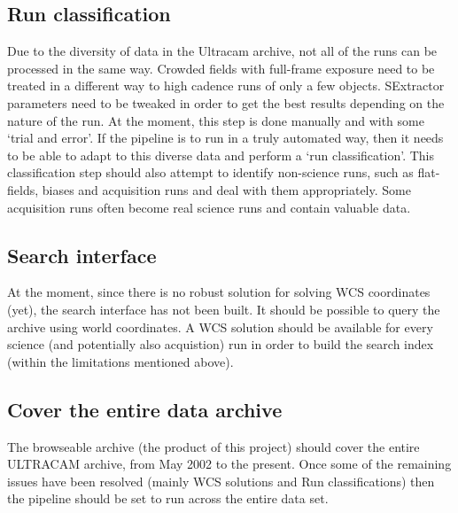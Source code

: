 \subsection{Run classification}
Due to the diversity of data in the Ultracam archive, not all of the runs can be processed in the same way. Crowded fields with full-frame exposure need to be treated in a different way to high cadence runs of only a few objects. SExtractor parameters need to be tweaked in order to get the best results depending on the nature of the run. At the moment, this step is done manually and with some `trial and error'. If the pipeline is to run in a truly automated way, then it needs to be able to adapt to this diverse data and perform a `run classification'. This classification step should also attempt to identify non-science runs, such as flat-fields, biases and acquisition runs and deal with them appropriately. Some acquisition runs often become real science runs and contain valuable data. 

\subsection{Search interface}
At the moment, since there is no robust solution for solving WCS coordinates (yet), the search interface has not been built. It should be possible to query the archive using world coordinates. A WCS solution should be available for every science (and potentially also acquistion) run in order to build the search index (within the limitations mentioned above). 

\subsection{Cover the entire data archive} 
The browseable archive (the product of this project) should cover the entire ULTRACAM archive, from May 2002 to the present. Once some of the remaining issues have been resolved (mainly WCS solutions and Run classifications) then the pipeline should be set to run across the entire data set. 

